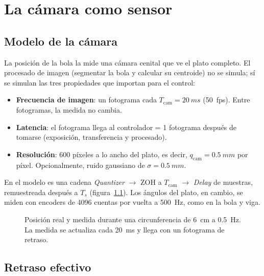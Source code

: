 \chapter{La cámara como sensor}
\label{cap:camara}

\section{Modelo de la cámara}

La posición de la bola la mide una cámara cenital que ve el plato completo. El procesado de imagen (segmentar la bola y calcular su centroide) no se simula; sí se simulan las tres propiedades que importan para el control:
\begin{itemize}
  \item \textbf{Frecuencia de imagen}: un fotograma cada $T_{\text{cam}}=\SI{20}{ms}$ (\SI{50}{fps}). Entre fotogramas, la medida no cambia.
  \item \textbf{Latencia}: el fotograma llega al controlador  = 1 fotograma después de tomarse (exposición, transferencia y procesado).
  \item \textbf{Resolución}: 600 píxeles a lo ancho del plato, es decir, $q_{\text{cam}}=\SI{0.5}{mm}$ por píxel. Opcionalmente, ruido gaussiano de $\sigma=\SI{0.5}{mm}$.
\end{itemize}
En el modelo es una cadena \emph{Quantizer} $\to$ ZOH a $T_{\text{cam}}$ $\to$ \emph{Delay} de  muestras, remuestreada después a $T_s$ (figura~\ref{fig:camara}). Los ángulos del plato, en cambio, se miden con encoders de 4096 cuentas por vuelta a \SI{500}{Hz}, como en la bola y viga.

\begin{figure}[H]
\centering
{}
\caption{Posición real y medida durante una circunferencia de \SI{6}{cm} a \SI{0.5}{Hz}. La medida se actualiza cada \SI{20}{ms} y llega con un fotograma de retraso.}
\label{fig:camara}
\end{figure}

\section{Retraso efectivo}

